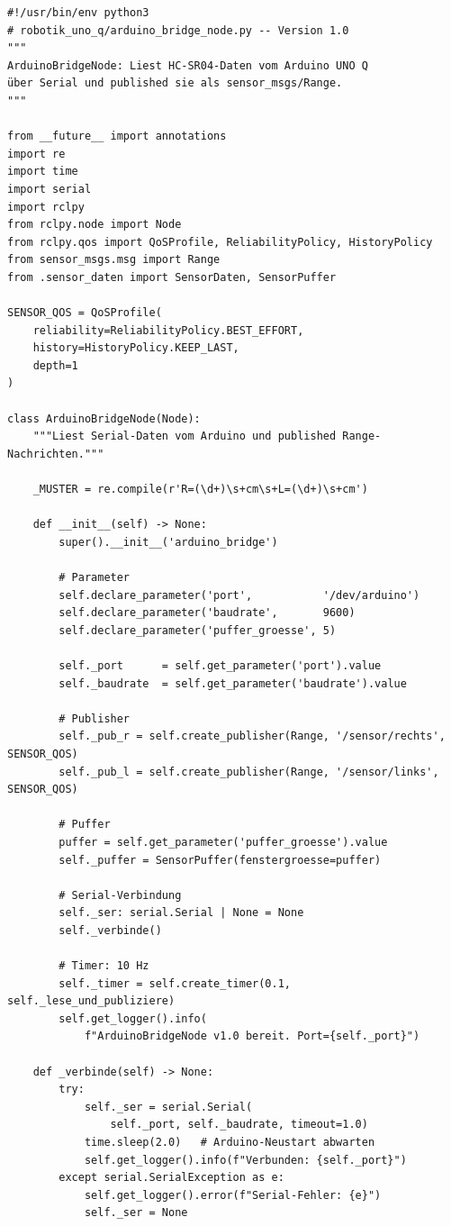 \begin{lstlisting}
#!/usr/bin/env python3
# robotik_uno_q/arduino_bridge_node.py -- Version 1.0
"""
ArduinoBridgeNode: Liest HC-SR04-Daten vom Arduino UNO Q
über Serial und published sie als sensor_msgs/Range.
"""

from __future__ import annotations
import re
import time
import serial
import rclpy
from rclpy.node import Node
from rclpy.qos import QoSProfile, ReliabilityPolicy, HistoryPolicy
from sensor_msgs.msg import Range
from .sensor_daten import SensorDaten, SensorPuffer

SENSOR_QOS = QoSProfile(
    reliability=ReliabilityPolicy.BEST_EFFORT,
    history=HistoryPolicy.KEEP_LAST,
    depth=1
)

class ArduinoBridgeNode(Node):
    """Liest Serial-Daten vom Arduino und published Range-Nachrichten."""

    _MUSTER = re.compile(r'R=(\d+)\s+cm\s+L=(\d+)\s+cm')

    def __init__(self) -> None:
        super().__init__('arduino_bridge')

        # Parameter
        self.declare_parameter('port',           '/dev/arduino')
        self.declare_parameter('baudrate',       9600)
        self.declare_parameter('puffer_groesse', 5)

        self._port      = self.get_parameter('port').value
        self._baudrate  = self.get_parameter('baudrate').value

        # Publisher
        self._pub_r = self.create_publisher(Range, '/sensor/rechts', SENSOR_QOS)
        self._pub_l = self.create_publisher(Range, '/sensor/links',  SENSOR_QOS)

        # Puffer
        puffer = self.get_parameter('puffer_groesse').value
        self._puffer = SensorPuffer(fenstergroesse=puffer)

        # Serial-Verbindung
        self._ser: serial.Serial | None = None
        self._verbinde()

        # Timer: 10 Hz
        self._timer = self.create_timer(0.1, self._lese_und_publiziere)
        self.get_logger().info(
            f"ArduinoBridgeNode v1.0 bereit. Port={self._port}")

    def _verbinde(self) -> None:
        try:
            self._ser = serial.Serial(
                self._port, self._baudrate, timeout=1.0)
            time.sleep(2.0)   # Arduino-Neustart abwarten
            self.get_logger().info(f"Verbunden: {self._port}")
        except serial.SerialException as e:
            self.get_logger().error(f"Serial-Fehler: {e}")
            self._ser = None


\end{lstlisting}
